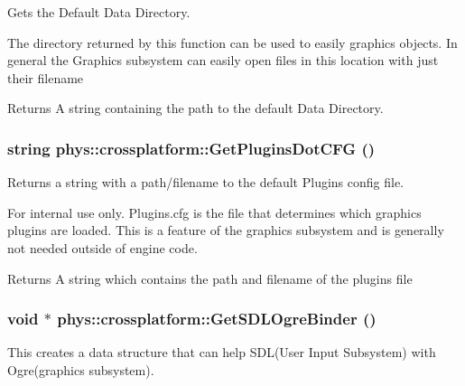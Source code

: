 Gets the Default Data Directory. 

The directory returned by this function can be used to easily graphics objects. In general the Graphics subsystem can easily open files in this location with just their filename \begin{DoxyReturn}{Returns}
A string containing the path to the default Data Directory. 
\end{DoxyReturn}
\hypertarget{namespacephys_1_1crossplatform_a8f7321f409f1f2a5fa07881ae22fcc2d}{
\subsubsection[{GetPluginsDotCFG}]{\setlength{\rightskip}{0pt plus 5cm}string phys::crossplatform::GetPluginsDotCFG ()}}
\label{d4/d59/namespacephys_1_1crossplatform_a8f7321f409f1f2a5fa07881ae22fcc2d}


Returns a string with a path/filename to the default Plugins config file. 

\begin{DoxyInternal}{For internal use only.}
Plugins.cfg is the file that determines which graphics plugins are loaded. This is a feature of the graphics subsystem and is generally not needed outside of engine code. \begin{DoxyReturn}{Returns}
A string which contains the path and filename of the plugins file 
\end{DoxyReturn}
\end{DoxyInternal}
\hypertarget{namespacephys_1_1crossplatform_a596ed780d507e681d9261d26b64a8ed9}{
\subsubsection[{GetSDLOgreBinder}]{\setlength{\rightskip}{0pt plus 5cm}void $\ast$ phys::crossplatform::GetSDLOgreBinder ()}}
\label{d4/d59/namespacephys_1_1crossplatform_a596ed780d507e681d9261d26b64a8ed9}


This creates a data structure that can help SDL(User Input Subsystem) with Ogre(graphics subsystem). 

